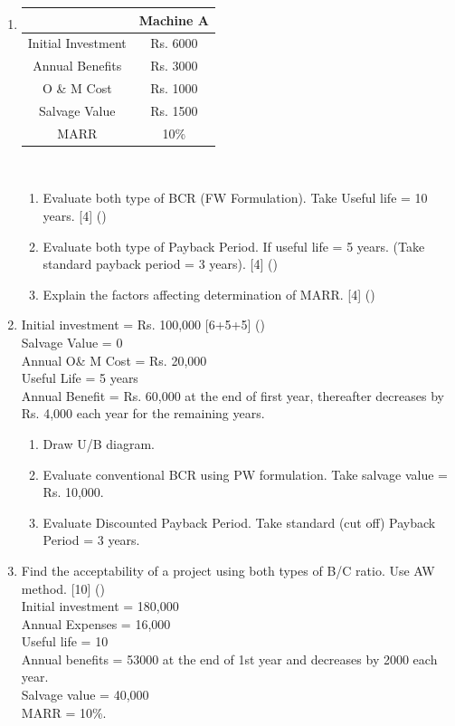 \documentclass[12pt]{article}
\begin{document}
\begin{enumerate}[noitemsep, topsep = 0pt]
		\item \begin{tabular}{|c|c|}
			\hline
			& Machine A \\ \hline
			Initial Investment & Rs. 6000 \\ \hline
			Annual Benefits & Rs. 3000 \\ \hline
			O \& M Cost & Rs. 1000 \\ \hline
			Salvage Value & Rs. 1500 \\ \hline
			MARR & 10\% \\ \hline
		\end{tabular}\\[0pt]
		\begin{enumerate}[noitemsep, topsep = 0pt, label = \alph*.]
			\item Evaluate both type of BCR (FW Formulation). Take Useful life = 10 years. \hfill [4] ()
			\item Evaluate both type of Payback Period. If useful life = 5 years. (Take standard payback period = 3 years). \hfill [4] ()
			\item Explain the factors affecting determination of MARR. \hfill [4] ()
		\end{enumerate}
		
		\item Initial investment = Rs. 100,000 \hfill [6+5+5] ()\\
		Salvage Value = 0\\
		Annual O\& M Cost = Rs. 20,000\\
		Useful Life = 5 years\\
		Annual Benefit = Rs. 60,000 at the end of first year, thereafter decreases by Rs. 4,000 each year for the remaining years.
		\begin{enumerate}[noitemsep, topsep = 0pt, label = \alph*.]
			\item Draw U/B diagram.
			\item Evaluate conventional BCR using PW formulation. Take salvage value = Rs. 10,000.
			\item Evaluate Discounted Payback Period. Take standard (cut off) Payback Period = 3 years.
		\end{enumerate}
		
		\item Find the acceptability of a project using both types of B/C ratio. Use AW method. \hfill [10] ()\\
		Initial investment = 180,000\\
		Annual Expenses = 16,000\\
		Useful life = 10\\
		Annual benefits = 53000 at the end of 1st year and decreases by 2000 each year.\\
		Salvage value = 40,000\\
		MARR = 10\%.
	\end{enumerate}
\end{document}
